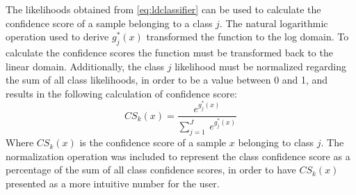 \noindent The likelihoods obtained from \eqref{eq:ldclassifier} can be used to calculate the confidence score of a sample belonging to a class $j$. The natural logarithmic operation used to derive $g_{j}^{*}(x)$ transformed the function to the log domain. To calculate the confidence scores the function must be transformed back to the linear domain. Additionally, the class $j$ likelihood must be normalized regarding the sum of all class likelihoods, in order to be a value between 0 and 1, and results in the following calculation of confidence score:
\vspace{-0.02cm}
\begin{equation}
	CS_{k}(x) = \frac{e^{g^{*}_{j}(x)}}{\sum\limits^{J}_{j=1}~e^{g^{*}_{j}(x)}}
\end{equation}
\vspace{-0.05cm}
\noindent Where $CS_{k}(x)$ is the confidence score of a sample $x$ belonging to class $j$. The normalization operation was included to represent the class confidence score as a percentage of the sum of all class confidence scores, in order to have $CS_{k}(x)$ presented as a more intuitive number for the user.

